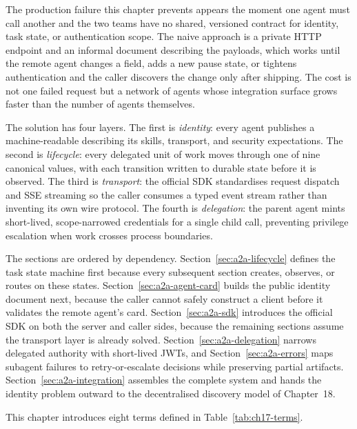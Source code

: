 

The production failure this chapter prevents appears the moment one agent
must call another and the two teams have no shared, versioned contract for
identity, task state, or authentication scope. The naive approach is a
private HTTP endpoint and an informal document describing the payloads,
which works until the remote agent changes a field, adds a new pause state,
or tightens authentication and the caller discovers the change only after
shipping. The cost is not one failed request but a network of agents whose
integration surface grows faster than the number of agents themselves.

The solution has four layers. The first is \emph{identity}: every agent
publishes a machine-readable  describing its skills,
transport, and security expectations. The second is \emph{lifecycle}:
every delegated unit of work moves through one of nine canonical
 values, with each transition written to durable state
before it is observed. The third is \emph{transport}: the official SDK
standardises request dispatch and SSE streaming so the caller consumes a
typed event stream rather than inventing its own wire protocol. The fourth
is \emph{delegation}: the parent agent mints short-lived, scope-narrowed
credentials for a single child call, preventing privilege escalation when
work crosses process boundaries.

The sections are ordered by dependency. Section~\ref{sec:a2a-lifecycle}
defines the task state machine first because every subsequent section
creates, observes, or routes on these states. Section~\ref{sec:a2a-agent-card}
builds the public identity document next, because the caller cannot safely
construct a client before it validates the remote agent's card.
Section~\ref{sec:a2a-sdk} introduces the official SDK on both the server
and caller sides, because the remaining sections assume the transport layer
is already solved. Section~\ref{sec:a2a-delegation} narrows delegated
authority with short-lived JWTs, and Section~\ref{sec:a2a-errors} maps
subagent failures to retry-or-escalate decisions while preserving partial
artifacts. Section~\ref{sec:a2a-integration} assembles the complete system
and hands the identity problem outward to the decentralised discovery model
of Chapter~18.

This chapter introduces eight terms defined in Table~\ref{tab:ch17-terms}.

